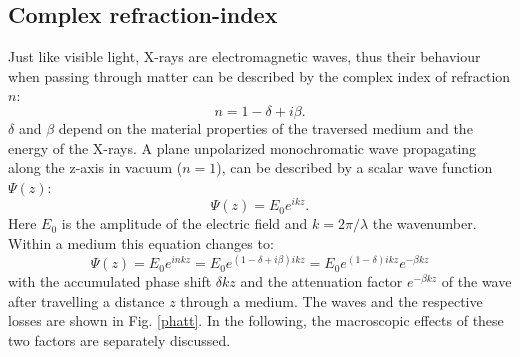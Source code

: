 \subsection{Complex refraction-index}\label{subsec:cri}
Just like visible light, X-rays are electromagnetic waves, thus their behaviour when passing through matter can be described by the complex index of refraction $n$:\citep{Als-nielsen}
\begin{equation}
n = 1 -\delta + i \beta .
\end{equation}
$\delta$ and $\beta$ depend on the material properties of the traversed medium and the energy of the X-rays. 
A plane unpolarized monochromatic wave propagating along the z-axis in vacuum ($n=1$), can be described by a scalar wave function $\Psi(z)$:
\begin{equation}
\Psi(z) = E_{0} e^{ikz}. \label{pw} 
\end{equation}
Here $E_{0}$ is the amplitude of the electric field and $k = 2\pi /\lambda$ the wavenumber. Within a medium this equation changes to:
\begin{equation}\label{medium} 
\Psi(z) = E_{0} e^{inkz} = E_{0} e^{(1-\delta + i\beta)ikz} = E_{0} e^{(1-\delta)ikz} e^{-\beta kz} 
\end{equation}
with the accumulated phase shift $\delta kz$ and the attenuation factor $e^{-\beta kz}$ of the wave after travelling a distance $z$ through a medium. The waves and the respective losses are shown in Fig. \ref{phatt}. In the following, the macroscopic effects of these two factors are separately discussed.  
